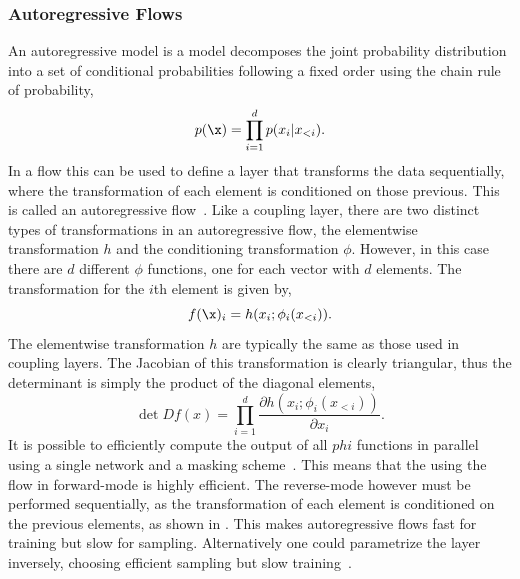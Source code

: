 \subsubsection{Autoregressive Flows}

An autoregressive model is a model decomposes the joint probability distribution into a set of conditional probabilities following a fixed order using the chain rule of probability,
\begin{equation}
    p(\x) = \prod_{i=1}^d p(x_i | x_{<i}).
\end{equation}
In a flow this can be used to define a layer that transforms the data sequentially, where the transformation of each element is conditioned on those previous.
This is called an autoregressive flow~\cite{MaskedAutoregressiveFlow}.
Like a coupling layer, there are two distinct types of transformations in an autoregressive flow, the elementwise transformation $h$ and the conditioning transformation $\phi$.
However, in this case there are $d$ different $\phi$ functions, one for each vector with $d$ elements.
The transformation for the $i$th element is given by,
\begin{equation}
    \label{eq:autoregressive_flow}
    f(\x)_i = h(x_i; \phi_i(x_{<i})).
\end{equation}
The elementwise transformation $h$ are typically the same as those used in coupling layers.
The Jacobian of this transformation is clearly triangular, thus the determinant is simply the product of the diagonal elements,
\begin{equation}
    \det D f(x) = \prod_{i=1}^d \frac{\partial h(x_i; \phi_i(x_{<i}))}{\partial x_i}.
\end{equation}
It is possible to efficiently compute the output of all $phi$ functions in parallel using a single network and a masking scheme~\cite{MADEMaskedAutoencoder}.
This means that the using the flow in forward-mode is highly efficient.
The reverse-mode however must be performed sequentially, as the transformation of each element is conditioned on the previous elements, as shown in .
This makes autoregressive flows fast for training but slow for sampling.
Alternatively one could parametrize the layer inversely, choosing efficient sampling but slow training~\cite{ImprovingVariationalInference}.


